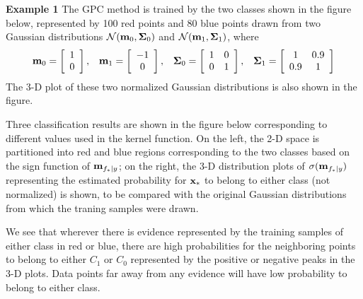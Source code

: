 \documentclass{article}
\begin{document}
{\bf Example 1} The GPC method is trained by the two classes shown in
the figure below, represented by 100 red points and 80 blue points 
drawn from two Gaussian distributions ${\cal N}({\bf m}_0,{\bf\Sigma}_0)$ 
and ${\cal N}({\bf m}_1,{\bf\Sigma}_1)$, where
\begin{equation}
{\bf m}_0=\left[\begin{array}{c}1\\0\end{array}\right],\;\;\;
{\bf m}_1=\left[\begin{array}{c}-1\\0\end{array}\right],\;\;\;
{\bf\Sigma}_0=\left[\begin{array}{cc}1&0\\0&1\end{array}\right],\;\;\;
{\bf\Sigma}_1=\left[\begin{array}{cc}1&0.9\\0.9&1\end{array}\right]
\end{equation}
The 3-D plot of these two normalized Gaussian distributions is also 
shown in the figure.


Three classification results are shown in the figure below corresponding 
to different values used in the kernel function. On the left, the 2-D
space is partitioned into red and blue regions corresponding to the 
two classes based on the sign function of ${\bf m}_{f_*|y}$; on the right,
the 3-D distribution plots of $\sigma({\bf m}_{f_*|y})$ representing the
estimated probability for ${\bf x}_*$ to belong to either class (not 
normalized) is shown, to be compared with the original Gaussian 
distributions from which the traning samples were drawn. 

We see that wherever there is evidence represented by the training 
samples of either class in red or blue, there are high probabilities 
for the neighboring points to belong to either $C_1$ or $C_0$ represented 
by the positive or negative peaks in the 3-D plots. Data points far 
away from any evidence will have low probability to belong to either 
class.
\end{document}
